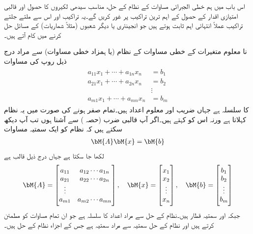 اس باب میں ہم خطی الجبرائی مساوات کے نظام کے حل، مناسب سیدھی لکیروں کا حصول اور قالبی امتیازی اقدار کے حصول کے  اہم ترین تراکیب پر غور کریں گے۔یہ تراکیب اور اس سے ملتے جلتے تراکیب عملاً انتہائی اہم ثابت ہوتے ہیں جو انجینئری یا دیگر شعبوں (مثلاً شماریات) کے مسائل حل کرنے میں کام آتے ہیں۔

 نا معلوم متغیرات   کے  خطی مساوات کے نظام (یا   ہمزاد خطی مساوات) سے مراد درج ذیل روپ کی مساوات
\begin{gather}
\begin{aligned}\label{مساوات_خطی_اعدادی_قالبی_نظام_الف}
a_{11}x_1+\cdots+a_{1n}x_n&=b_1\\
a_{21}x_1+\cdots+a_{2n}x_n&=b_2\\
&\vdots\\
a_{m1}x_1+\cdots+a_{mn}x_n&=b_m
\end{aligned}
\end{gather}  
کا سلسلہ ہے  جہاں  ضریب   اور  معلوم اعداد ہیں۔تمام  صفر ہونے کی صورت میں یہ نظام  کہلاتا ہے ورنہ اس کو  کہتے ہیں۔اگر آپ قالبی ضرب (حصہ ) سے آشنا ہوں  تب آپ دیکھ سکتے ہیں کہ نظام  کو ایک سمتیہ  مساوات
\begin{align}\label{مساوات_خطی_اعدادی_قالبی_نظام_ب}
\bM{A}\bM{x}=\bM{b}
\end{align}
لکھا جا سکتا ہے جہاں   درج ذیل  قالب ہے
\begin{align*}
\bM{A}=
\begin{bmatrix}
a_{11}&a_{12}\cdots a_{1n}\\
a_{21}&a_{22}\cdots a_{2n}\\
\vdots\\
a_{m1}&a_{m2}\cdots a_{mn}
\end{bmatrix},
\quad
\bM{x}=
\begin{bmatrix}
x_1\\
x_2\\
\vdots\\
x_n
\end{bmatrix},
\quad
\bM{b}=
\begin{bmatrix}
b_1\\
b_2\\
\vdots\\
b_m
\end{bmatrix}
\end{align*}
جبکہ  اور  سمتیہ قطار ہیں۔نظام  کے حل سے مراد اعداد  کا سلسلہ ہے جو ان تمام  مساوات کو مطمئن کرتے ہیں اور نظام  کے حل سمتیہ سے مراد سمتیہ  ہے جس کے اجزاء  نظام  کے حل ہیں۔


